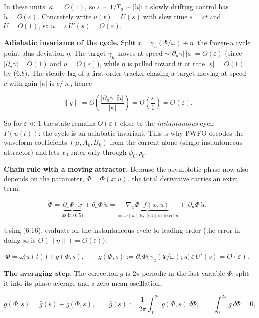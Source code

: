 \documentclass[
  11pt,
]{article}
\begin{document}
In these units \(|\kappa|=O(1)\), so
\(\varepsilon\sim 1/T_u\sim|\dot u|\): a slowly drifting control has
\(\dot u=O(\varepsilon)\). Concretely write \(u(t)=U(s)\) with slow time
\(s=\varepsilon t\) and \(U=O(1)\), so
\(\dot u=\varepsilon\,U'(s)=O(\varepsilon)\).

\textbf{Adiabatic invariance of the cycle.} Split
\(x=\gamma_{u}(\Phi/\omega)+\eta\), the frozen-\(u\) cycle point plus
deviation \(\eta\). The target \(\gamma_u\) moves at speed
\(\sim|\partial_u\gamma|\,|\dot u|=O(\varepsilon)\) (since
\(|\partial_u\gamma|=O(1)\) and \(\dot u=O(\varepsilon)\)), while
\(\eta\) is pulled toward it at rate \(|\kappa|=O(1)\) by (6.8). The
steady lag of a first-order tracker chasing a target moving at speed
\(c\) with gain \(|\kappa|\) is \(c/|\kappa|\), hence

\[
\|\eta\|=O\!\left(\frac{|\partial_u\gamma|\,|\dot u|}{|\kappa|}\right)=O\!\left(\frac{\varepsilon}{1}\right)=O(\varepsilon).
\tag{6.16}
\]

So for \(\varepsilon\ll1\) the state remains \(O(\varepsilon)\)-close to
the \emph{instantaneous} cycle \(\Gamma(u(t))\): the cycle is an
adiabatic invariant. This is why PWFO decodes the waveform coefficients
\((\mu,A_k,B_k)\) from the current alone (single instantaneous
attractor) and lets \(x_0\) enter only through \(\phi_0,\rho_0\).

\textbf{Chain rule with a moving attractor.} Because the asymptotic
phase now also depends on the parameter, \(\Phi=\Phi(x;u)\), the total
derivative carries an extra term:

\[
\dot\Phi
=\underbrace{\partial_x\Phi\cdot\dot x}_{\text{as in (6.5)}}+\partial_u\Phi\,\dot u
=\underbrace{\nabla_x\Phi\cdot f(x,u)}_{=\ \omega(u)\ \text{by (6.5) at fixed }u}
+\ \partial_u\Phi\,\dot u .
\tag{6.17}
\]

Using (6.16), evaluate on the instantaneous cycle to leading order (the
error in doing so is \(O(\|\eta\|)=O(\varepsilon)\)):

\[
\dot\Phi=\omega\big(u(t)\big)+g(\Phi,s),\qquad
g(\Phi,s):=\partial_u\Phi\big(\gamma_{u}(\Phi/\omega);u\big)\,\varepsilon\,U'(s)=O(\varepsilon).
\tag{6.18}
\]

\textbf{The averaging step.} The correction \(g\) is \(2\pi\)-periodic
in the fast variable \(\Phi\); split it into its phase-average and a
zero-mean oscillation,

\[
g(\Phi,s)=\bar g(s)+\tilde g(\Phi,s),\qquad
\bar g(s):=\frac{1}{2\pi}\int_0^{2\pi} g(\Phi,s)\,d\Phi,\qquad
\int_0^{2\pi}\tilde g\,d\Phi=0 ,
\]
\end{document}
